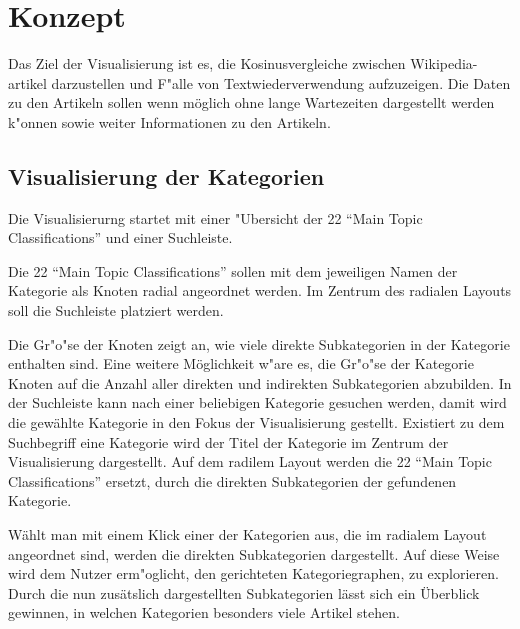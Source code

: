 







\section{Konzept}
Das Ziel der Visualisierung ist es, die Kosinusvergleiche zwischen Wikipedia-artikel darzustellen und F"alle von Textwiederverwendung aufzuzeigen.
Die Daten zu den Artikeln sollen wenn möglich ohne lange Wartezeiten dargestellt werden k"onnen sowie weiter Informationen zu den Artikeln.


\subsection{Visualisierung der Kategorien}
Die Visualisierurng startet mit einer "Ubersicht der 22 "`Main Topic Classifications"'  und einer Suchleiste.

Die 22 "`Main Topic Classifications"' sollen mit dem jeweiligen Namen der Kategorie als Knoten radial angeordnet werden. Im Zentrum des radialen Layouts soll die Suchleiste platziert werden.

Die Gr"o"se der Knoten zeigt an, wie viele direkte Subkategorien in der Kategorie enthalten sind. 
Eine weitere Möglichkeit w"are 
es, die Gr"o"se der Kategorie Knoten auf die Anzahl aller direkten und indirekten Subkategorien abzubilden.
In der Suchleiste kann nach einer beliebigen Kategorie gesuchen werden, damit wird die gewählte Kategorie in den Fokus der Visualisierung gestellt.
Existiert zu dem Suchbegriff eine Kategorie wird der Titel der Kategorie im Zentrum der Visualisierung dargestellt.
Auf dem radilem Layout werden die 22 "`Main Topic Classifications"' ersetzt, durch die direkten Subkategorien der gefundenen Kategorie.

Wählt man mit einem Klick einer der Kategorien aus, die im radialem Layout angeordnet sind, werden die direkten Subkategorien dargestellt.
Auf diese Weise wird dem Nutzer erm"oglicht, den gerichteten Kategoriegraphen, zu explorieren.
Durch die nun zusätslich dargestellten Subkategorien lässt sich ein Überblick gewinnen, in welchen Kategorien besonders viele Artikel stehen.

